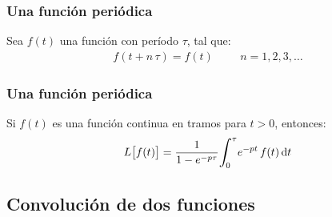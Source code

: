 \begin{frame}
\frametitle{Una función periódica}
Sea $f (t)$ una función con período $\tau$, tal que:
\pause
\begin{align*}
f (t + n \, \tau) = f (t) \hspace{1cm} n = 1, 2, 3, \ldots
\end{align*}
\end{frame}
\begin{frame}
\frametitle{Una función periódica}
Si $f (t)$ es una función continua en tramos para $t > 0$, entonces:
\pause
\begin{align}
L \big[  f (t)  \big] = \dfrac{1}{1 - e^{-p \tau}} \scaleint{6ex}_{\bs 0}^{\tau} e^{-p t} \, f (t) \dd{t}
\end{align}
\end{frame}

\subsection{Convolución de dos funciones}


